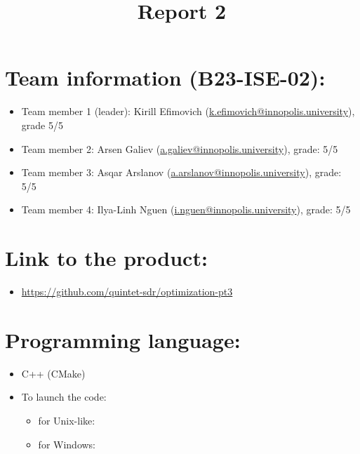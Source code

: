 \documentclass{article}
\title{\textbf{Report 2}}
\author{}
\date{}
\begin{document}
\maketitle

\thispagestyle{fancy}

\section*{Team information (B23-ISE-02):}
\begin{itemize}
    \item Team member 1 (leader): Kirill Efimovich (\href{mailto:k.efimovich@innopolis.university}{k.efimovich@innopolis.university}), grade 5/5
    \item Team member 2: Arsen Galiev (\href{mailto:a.galiev@innopolis.university}{a.galiev@innopolis.university}), grade: 5/5
    \item Team member 3: Asqar Arslanov (\href{mailto:a.arslanov@innopolis.university}{a.arslanov@innopolis.university}), grade: 5/5
    \item Team member 4: Ilya-Linh Nguen (\href{mailto:i.nguen@innopolis.university}{i.nguen@innopolis.university}), grade: 5/5
\end{itemize}

\section*{Link to the product:}

\begin{itemize}
    \item \url{https://github.com/quintet-sdr/optimization-pt3}
\end{itemize}

\section*{Programming language:}

\begin{itemize}
    \item C++ (CMake)
    \item To launch the code:
          \begin{itemize}
              \item for Unix-like:  \\
              \item for Windows: 
          \end{itemize}
\end{itemize}
\end{document}
